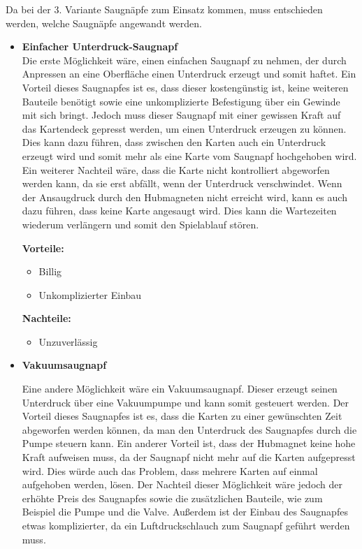 Da bei der 3. Variante Saugnäpfe zum Einsatz kommen, muss entschieden werden, welche Saugnäpfe angewandt werden.

\begin{itemize}
    \item \textbf{Einfacher Unterdruck-Saugnapf} \\
    Die erste Möglichkeit wäre, einen einfachen Saugnapf zu nehmen, der durch Anpressen an eine Oberfläche einen Unterdruck erzeugt und somit haftet.
    Ein Vorteil dieses Saugnapfes ist es, dass dieser kostengünstig ist, keine weiteren Bauteile benötigt sowie eine unkomplizierte Befestigung über ein Gewinde mit sich bringt.
    Jedoch muss dieser Saugnapf mit einer gewissen Kraft auf das Kartendeck gepresst werden, um einen Unterdruck erzeugen zu können.
    Dies kann dazu führen, dass zwischen den Karten auch ein Unterdruck erzeugt wird und somit mehr als eine Karte vom Saugnapf hochgehoben wird.
    Ein weiterer Nachteil wäre, dass die Karte nicht kontrolliert abgeworfen werden kann, da sie erst abfällt, wenn der Unterdruck verschwindet.
    Wenn der Ansaugdruck durch den Hubmagneten nicht erreicht wird, kann es auch dazu führen, dass keine Karte angesaugt wird.
    Dies kann die Wartezeiten wiederum verlängern und somit den Spielablauf stören.

    \textbf{Vorteile:}
    \begin{itemize}
        \item Billig
        \item Unkomplizierter Einbau
    \end{itemize}
    \textbf{Nachteile:}
    \begin{itemize}
        \item Unzuverlässig
    \end{itemize}

    \item \textbf{Vakuumsaugnapf}

    Eine andere Möglichkeit wäre ein Vakuumsaugnapf.
    Dieser erzeugt seinen Unterdruck über eine Vakuumpumpe und kann somit gesteuert werden.
    Der Vorteil dieses Saugnapfes ist es, dass die Karten zu einer gewünschten Zeit abgeworfen werden können, da man den Unterdruck des Saugnapfes durch die Pumpe steuern kann.
    Ein anderer Vorteil ist, dass der Hubmagnet keine hohe Kraft aufweisen muss, da der Saugnapf nicht mehr auf die Karten aufgepresst wird.
    Dies würde auch das Problem, dass mehrere Karten auf einmal aufgehoben werden, lösen.
    Der Nachteil dieser Möglichkeit wäre jedoch der erhöhte Preis des Saugnapfes sowie die zusätzlichen Bauteile, wie zum Beispiel die Pumpe und die Valve.
    Außerdem ist der Einbau des Saugnapfes etwas komplizierter, da ein Luftdruckschlauch
    zum Saugnapf geführt werden muss.


\end{itemize}
